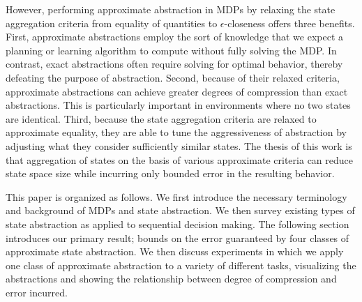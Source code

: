 However, performing approximate abstraction in \acp{MDP} by relaxing the state aggregation criteria from equality of quantities to $\epsilon$-closeness offers three benefits. First, approximate abstractions employ the sort of knowledge that we expect a planning or learning algorithm to compute without fully solving the \ac{MDP}. In contrast, exact abstractions often require solving for optimal behavior, thereby defeating the purpose of abstraction. Second, because of their relaxed criteria, approximate abstractions can achieve greater degrees of compression than exact abstractions. This is particularly important in environments where no two states are identical.  Third, because the state aggregation criteria are relaxed to approximate equality, they are able to tune the aggressiveness of abstraction by adjusting what they consider sufficiently similar states. The thesis of this work is that aggregation of states on the basis of various approximate criteria can reduce state space size while incurring only bounded error in the resulting behavior.

This paper is organized as follows. We first introduce the necessary terminology and background of \acp{MDP} and state abstraction. We then survey existing types of state abstraction as applied to sequential decision making. The following section introduces our primary result; bounds on the error guaranteed by four classes of approximate state abstraction. We then discuss experiments in which we apply one class of approximate abstraction to a variety of different tasks, visualizing the abstractions and showing the relationship between degree of compression and error incurred.
